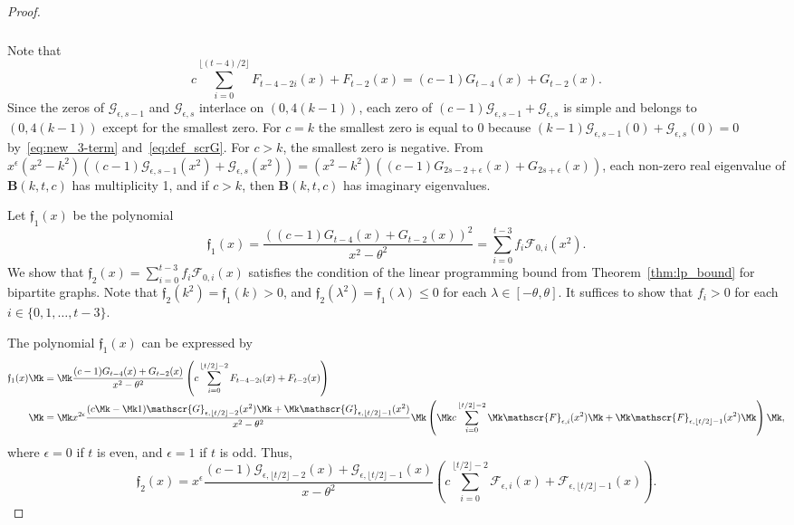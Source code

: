 \begin{proof}
\begin{multline*}
\begin{aligned}
\end{aligned}
\end{multline*}
Note that
\[
c\sum_{i=0}^{ \lfloor (t-4)/2 \rfloor}F_{t-4-2i}(x)+F_{t-2}(x)=(c-1){G}_{t-4}(x)+{G}_{t-2}(x). 
\]
Since the zeros of $\mathscr{G}_{\epsilon,s-1}$ and $\mathscr{G}_{\epsilon,s}$ interlace on $(0,4(k-1))$, each zero of $(c-1)\mathscr{G}_{\epsilon,s-1}+\mathscr{G}_{\epsilon,s}$ is simple and belongs to $(0,4(k-1))$ except for the smallest zero. 
For $c=k$ the smallest zero is equal to $0$ because 
$
(k-1)\mathscr{G}_{\epsilon,s-1}(0)+\mathscr{G}_{\epsilon,s}(0)=0
$ 
by~\eqref{eq:new_3-term} and~\eqref{eq:def_scrG}. 
For $c>k$, the smallest zero is negative. From $x^{\epsilon}(x^2-k^2)((c-1)\mathscr{G}_{\epsilon,s-1}(x^2)+\mathscr{G}_{\epsilon,s}(x^2))=(x^2-k^2)((c-1){G}_{2s-2+\epsilon}(x)+{G}_{2s+\epsilon}(x))$, 
each non-zero real eigenvalue of 
$\boldsymbol{B}(k,t,c)$ has multiplicity 1, 
and if $c>k$, then $\boldsymbol{B}(k,t,c)$ has 
imaginary eigenvalues. 

Let $\mathfrak{f}_1(x)$ be the polynomial 
\[
\mathfrak{f}_1(x)=\frac{((c-1){G}_{t-4}(x)+G_{t-2}(x))^2}{x^2-\theta^2}=\sum_{i=0}^{ t- 3} f_i \mathscr{F}_{0,i}(x^2).
\]
We show that $\mathfrak{f}_2(x)=\sum_{i=0}^{ t - 3} f_i \mathscr{F}_{0,i}(x)$ satisfies the condition of the linear programming bound from Theorem~\ref{thm:lp_bound} for bipartite graphs. 
Note that $\mathfrak{f}_2(k^2)=\mathfrak{f}_1(k)>0$, and $\mathfrak{f}_2(\lambda^2)=\mathfrak{f}_1(\lambda) \leq 0$ for each $\lambda \in [-\theta, \theta]$. 
It suffices to show that $f_i>0$ for each $i\in \{0,1,\ldots, t- 3\}$. 
 
The polynomial $\mathfrak{f}_1(x)$ can be expressed by 
\begin{align*}
\mathfrak{f}_1(x)&\Mk =\Mk 
\frac{(c-1){G}_{t-4}(x)+{G}_{t-2}(x)}{x^2-\theta^2}
\left(c\sum_{i=0}^{\lfloor t/2 \rfloor-2}{F}_{t-4-2i}(x)+{F}_{t-2}(x) \right)\\
&\Mk =\Mk x^{2\epsilon}
\frac{(c\Mk -\Mk 1)\mathscr{G}_{\epsilon,\lfloor t/2 \rfloor-2 }(x^2)\Mk +\Mk \mathscr{G}_{\epsilon,\lfloor t/2 \rfloor-1 }(x^2)}{x^2-\theta^2}
\Mk \left(\Mk c\sum_{i=0}^{\lfloor t/2 \rfloor-2}\Mk \mathscr{F}_{\epsilon,i}(x^2)\Mk +\Mk 
\mathscr{F}_{\epsilon,\lfloor t/2 \rfloor-1}(x^2)\Mk \right)\Mk , 
\end{align*}
where $\epsilon=0$ if $t$ is even, 
and $\epsilon=1$ if $t$ is odd. Thus, 
\[
\mathfrak{f}_2(x)=x^{\epsilon}
\frac{(c-1)\mathscr{G}_{\epsilon,\lfloor t/2 \rfloor-2 }(x)+\mathscr{G}_{\epsilon,\lfloor t/2 \rfloor-1 }(x)}{x-\theta^2}
\left(c\sum_{i=0}^{\lfloor t/2 \rfloor-2}\mathscr{F}_{\epsilon,i}(x)+
\mathscr{F}_{\epsilon,\lfloor t/2 \rfloor-1}(x)\right).
\]


\end{proof}
